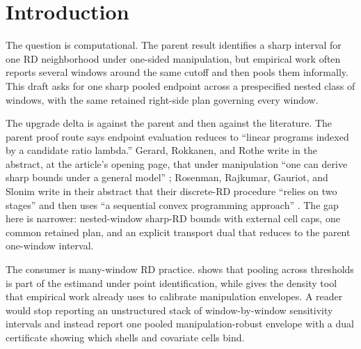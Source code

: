 \documentclass[11pt]{article}
\theoremstyle{definition}
\theoremstyle{plain}
\theoremstyle{remark}
\begin{document}
\begin{abstract}
The banked parent proposal \texttt{pid\_rdd\_manipulation\_bounded/v1} gives a sharp interval for one
cutoff neighborhood under bounded manipulation.  This upgrade asks for one computational object that
evaluates manipulation-robust bounds across a prespecified nested class of neighborhoods.  The fixed
retained-mass problem is the key step: once the admissible retained masses are pinned down, the pooled
upper endpoint becomes a finite transportation problem over shell atoms and neighborhood-cell demands.
The flagship open claim is that the outer optimization over retained masses can be absorbed into an
expanded min-cost-flow network with a totally unimodular constraint matrix and an explicit dual
certificate.  If correct, the parent scalar interval becomes the \(J=1\) face of a strongly-polynomial
algorithm for many-neighborhood RD sensitivity analysis.
\end{abstract}

\section{Introduction}
The question is computational.  The parent result identifies a sharp interval for one RD neighborhood under
one-sided manipulation, but empirical work often reports several windows around the same cutoff and then
pools them informally.  This draft asks for one sharp pooled endpoint across a prespecified nested class of
windows, with the same retained right-side plan governing every window.

The upgrade delta is against the parent and then against the literature.  The parent proof route says
endpoint evaluation reduces to ``linear programs indexed by a candidate ratio lambda.''  Gerard, Rokkanen,
and Rothe write in the abstract, at the article's opening page, that under manipulation ``one can derive
sharp bounds under a general model'' \citep[p.~839]{GerardRokkanenRothe2020}; Rosenman, Rajkumar, Gauriot,
and Slonim write in their abstract that their discrete-RD procedure ``relies on two stages'' and then
uses ``a sequential convex programming approach'' \citep[p.~1]{RosenmanRajkumarGauriotSlonim2019}.  The
gap here is narrower: nested-window sharp-RD bounds with external cell caps, one common retained plan, and
an explicit transport dual that reduces to the parent one-window interval.

The consumer is many-window RD practice.  \citet{Bertanha2020} shows that pooling across thresholds is part
of the estimand under point identification, while \citet{CattaneoJanssonMa2020} gives the density tool that
empirical work already uses to calibrate manipulation envelopes.  A reader would stop reporting an
unstructured stack of window-by-window sensitivity intervals and instead report one pooled
manipulation-robust envelope with a dual certificate showing which shells and covariate cells bind.
\end{document}
